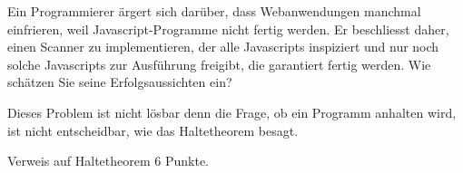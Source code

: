 Ein Programmierer ärgert sich darüber, dass Webanwendungen manchmal
einfrieren, weil Javascript-Programme nicht fertig werden.
Er beschliesst daher, einen Scanner zu implementieren, der alle
Java\-scripts inspiziert und nur noch solche Javascripts zur Ausführung
freigibt, die garantiert fertig werden. Wie schätzen Sie seine
Erfolgsaussichten ein?


\begin{loesung}
Dieses Problem ist nicht lösbar denn die Frage, ob ein Programm 
anhalten wird, ist nicht entscheidbar, wie das Haltetheorem besagt.
\end{loesung}

\begin{bewertung}
Verweis auf Haltetheorem 6 Punkte.
\end{bewertung}
